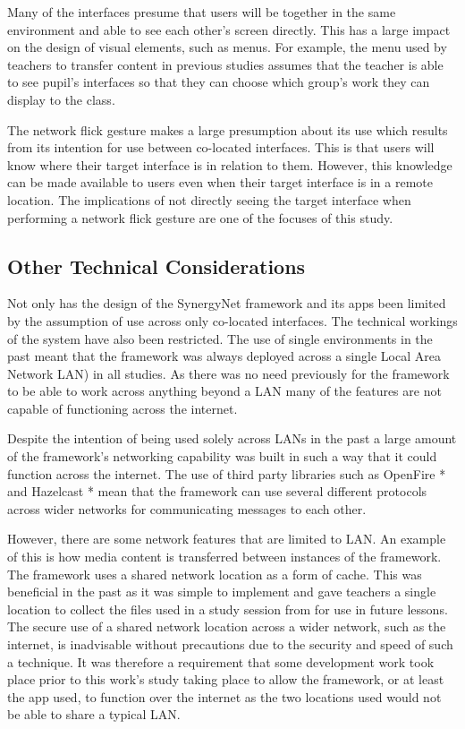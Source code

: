 \documentclass[a4paper,11pt]{article}
\begin{document}
Many of the interfaces presume that users will be together in the same environment and able to see each other's screen directly.
This has a large impact on the design of visual elements, such as menus.
For example, the menu used by teachers to transfer content in previous studies assumes that the teacher is able to see pupil's interfaces so that they can choose which group's work they can display to the class.


The network flick gesture makes a large presumption about its use which results from its intention for use between co-located interfaces.
This is that users will know where their target interface is in relation to them.
However, this knowledge can be made available to users even when their target interface is in a remote location.
The implications of not directly seeing the target interface when performing a network flick gesture are one of the focuses of this study.

\subsection{Other Technical Considerations}

Not only has the design of the SynergyNet framework and its apps been limited by the assumption of use across only co-located interfaces.
The technical workings of the system have also been restricted.
The use of single environments in the past meant that the framework was always deployed across a single Local Area Network LAN) in all studies.
As there was no need previously for the framework to be able to work across anything beyond a LAN many of the features are not capable of functioning across the internet.

Despite the intention of being used solely across LANs in the past a large amount of the framework's networking capability was built in such a way that it could function across the internet.
The use of third party libraries such as OpenFire * and Hazelcast * mean that the framework can use several different protocols across wider networks for communicating messages to each other. %

However, there are some network features that are limited to LAN.
An example of this is how media content is transferred between instances of the framework.
The framework uses a shared network location as a form of cache.
This was beneficial in the past as it was simple to implement and gave teachers a single location to collect the files used in a study session from for use in future lessons.
The secure use of a shared network location across a wider network, such as the internet, is inadvisable without precautions due to the security and speed of such a technique.
It was therefore a requirement that some development work took place prior to this work's study taking place to allow the framework, or at least the app used, to function over the internet as the two locations used would not be able to share a typical LAN.
\end{document}
